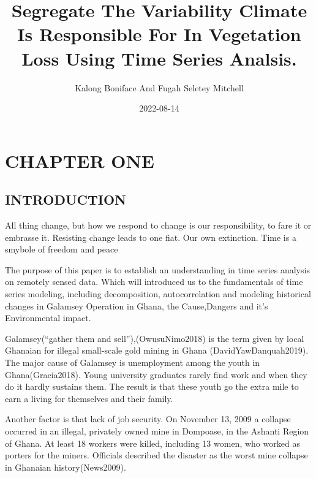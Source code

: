 \documentclass[
  letterpaper,
  DIV=11,
  numbers=noendperiod]{scrartcl}
\title{Segregate The Variability Climate Is Responsible For In
Vegetation Loss Using Time Series Analsis.}
\author{Kalong Boniface And Fugah Seletey Mitchell}
\date{2022-08-14}
\renewcommand*\contentsname{Table of contents}
\newcommand\contentsname{Table of contents}
\begin{document}
\maketitle
\ifdefined\Shaded\renewenvironment{Shaded}{\begin{tcolorbox}[boxrule=0pt, borderline west={3pt}{0pt}{shadecolor}, frame hidden, interior hidden, enhanced, breakable, sharp corners]}{\end{tcolorbox}}\fi

\renewcommand*\contentsname{Table of Contents}
{
\hypersetup{linkcolor=}
\setcounter{tocdepth}{2}
\tableofcontents
}
\hypertarget{chapter-one}{%
\section{CHAPTER ONE}\label{chapter-one}}

\hypertarget{introduction}{%
\subsection{INTRODUCTION}\label{introduction}}

All thing change, but how we respond to change is our responsibility, to
fare it or embrasse it. Resisting change leads to one fiat. Our own
extinction. Time is a smybole of freedom and peace

The purpose of this paper is to establish an understanding in time
series analysis on remotely sensed data. Which will introduced us to the
fundamentals of time series modeling, including decomposition,
autocorrelation and modeling historical changes in Galamsey Operation in
Ghana, the Cause,Dangers and it's Environmental impact.

Galamsey(``gather them and sell''),(OwusuNimo2018) is the term given by
local Ghanaian for illegal small-scale gold mining in Ghana
(DavidYawDanquah2019). The major cause of Galamsey is unemployment among
the youth in Ghana(Gracia2018). Young university graduates rarely find
work and when they do it hardly sustains them. The result is that these
youth go the extra mile to earn a living for themselves and their
family.

Another factor is that lack of job security. On November 13, 2009 a
collapse occurred in an illegal, privately owned mine in Dompoase, in
the Ashanti Region of Ghana. At least 18 workers were killed, including
13 women, who worked as porters for the miners. Officials described the
disaster as the worst mine collapse in Ghanaian history(News2009).
\end{document}
